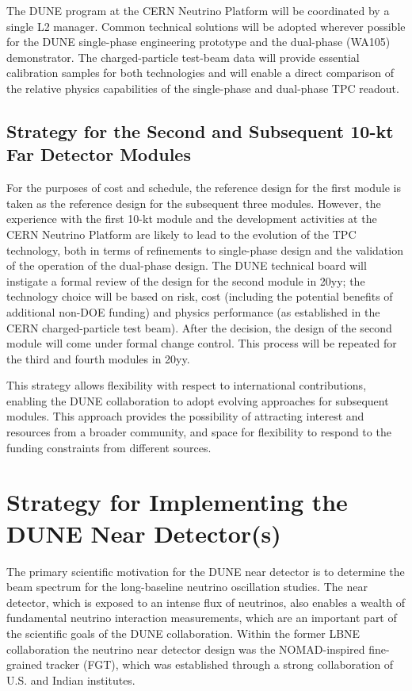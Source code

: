 The DUNE program at the CERN Neutrino Platform will be coordinated by a single 
L2 manager. Common technical solutions will be adopted wherever possible for the 
DUNE single-phase engineering prototype and the dual-phase (WA105) demonstrator. 
The charged-particle test-beam data will provide essential calibration samples 
for both technologies and will enable a direct comparison of the relative physics 
capabilities of the single-phase and dual-phase TPC readout. 

\subsection{Strategy for the Second and Subsequent 10-kt Far Detector Modules}
\label{v1ch3:subsqt-fd-mod-strategy}

For the purposes of cost and schedule, the reference design for the first module 
is taken as the reference design for the subsequent three modules. However, 
the experience with the first 10-kt module and the development activities at 
the CERN Neutrino Platform are likely to lead to the evolution of the TPC technology, both 
in terms of refinements to single-phase design and the validation of the operation 
of the dual-phase design. The DUNE technical board will instigate a formal review 
of the design for the second module in 20yy; %
the technology choice 
will be based on risk, cost (including the potential benefits of additional 
non-DOE funding) and physics performance (as established in the CERN charged-particle 
test beam). After the decision, the design of the second module will come under formal 
change control. This process will be repeated for the third and fourth modules 
in 20yy.%

This strategy allows flexibility with respect to international contributions, 
enabling the DUNE collaboration to
adopt evolving approaches for subsequent modules. This approach provides the possibility of attracting interest 
and resources from a broader community, and space for flexibility to respond to 
the funding constraints from different sources. 

\section{Strategy for Implementing the DUNE Near Detector(s)}
\label{v1ch:strategyND}

 The primary scientific motivation for 
the DUNE near detector %
is to determine the beam spectrum for the long-baseline 
neutrino oscillation studies. The near detector, which is exposed to an intense 
flux of neutrinos, also enables a wealth of fundamental neutrino 
interaction measurements, which are an important part of the  scientific 
goals of the DUNE collaboration. Within the former LBNE collaboration the neutrino 
near detector design was the NOMAD-inspired fine-grained tracker (FGT), which 
was established through a strong collaboration of U.S. and Indian institutes.


